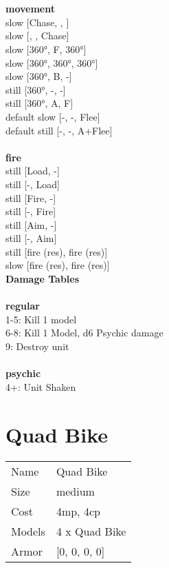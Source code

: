  
\ \\



\ \\ {\bf movement } \\
slow [Chase, , ] \\
slow [, , Chase] \\
slow [360°, F, 360°] \\
slow [360°, 360°, 360°] \\
slow [360°, B, -] \\
still [360°, -, -] \\
still [360°, A, F] \\
default slow [-, -, Flee] \\
default still [-, -, A+Flee] \\
\ \\ {\bf fire } \\
still [Load, -] \\
still [-, Load] \\
still [Fire, -] \\
still [-, Fire] \\
still [Aim, -] \\
still [-, Aim] \\
still [fire (res), fire (res)] \\
slow [fire (res), fire (res)] \\


{\bf Damage Tables} \\
\ \\ {\bf regular } \\
1-5: Kill 1 model \\
6-8: Kill 1 Model, d6 Psychic damage \\
9: Destroy unit \\
\ \\ {\bf psychic } \\
4+: Unit Shaken \\










\pagebreak\pagebreak

\section{ Quad Bike }

\begin{tabular}{ll}
  Name & Quad Bike \\
  Size & medium\\
  Cost & 4mp, 4cp\\
  Models & 4 x Quad Bike\\
  Armor & [0, 0, 0, 0]\\
\end{tabular}

